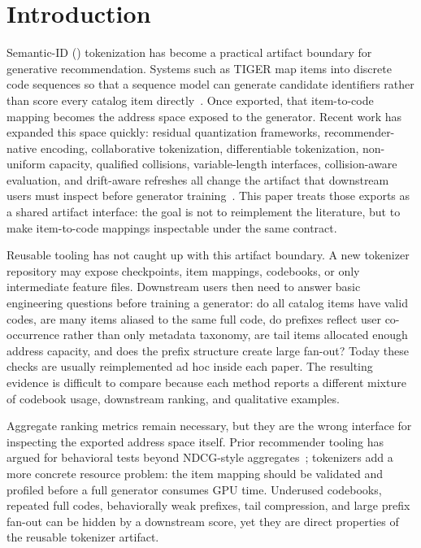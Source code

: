 \section{Introduction}

Semantic-ID (\sid) tokenization has become a practical artifact boundary for
generative recommendation. Systems such as TIGER map items into discrete code
sequences so that a sequence model can generate candidate identifiers rather
than score every catalog item directly~\cite{rajput2023tiger}. Once exported,
that item-to-code mapping becomes the address space exposed to the generator.
Recent work has expanded this space quickly: residual quantization frameworks,
recommender-native encoding, collaborative tokenization, differentiable
tokenization, non-uniform capacity, qualified collisions, variable-length
interfaces, collision-aware evaluation, and drift-aware refreshes all change
the artifact that downstream users must inspect before generator
training~\cite{ju2025grid,liang2026resid,zhu2024cost,fu2026diger,wei2026card,hu2026quasid,zhang2026sidreliability,cheng2026capsid,feng2026dact}.
This paper treats those exports as a shared artifact interface: the goal is not
to reimplement the literature, but to make item-to-code mappings
inspectable under the same contract.

Reusable tooling has not caught up with this artifact boundary. A new
tokenizer repository may expose checkpoints, item mappings, codebooks, or only
intermediate feature files. Downstream users then need to answer basic
engineering questions before training a generator: do all catalog items have
valid codes, are many items aliased to the same full code, do prefixes reflect
user co-occurrence rather than only metadata taxonomy, are tail items allocated
enough address capacity, and does the prefix structure create large fan-out?
Today these checks are usually reimplemented ad hoc inside each paper. The
resulting evidence is difficult to compare because each method reports a
different mixture of codebook usage, downstream ranking, and qualitative
examples.

Aggregate ranking metrics remain necessary, but they are the wrong interface
for inspecting the exported address space itself. Prior recommender tooling has
argued for behavioral tests beyond NDCG-style aggregates~\cite{chia2022reclist};
\sid tokenizers add a more concrete resource problem: the item mapping should
be validated and profiled before a full generator consumes GPU time. Underused
codebooks, repeated full codes, behaviorally weak prefixes, tail compression,
and large prefix fan-out can be hidden by a downstream score, yet they are
direct properties of the reusable tokenizer artifact.

